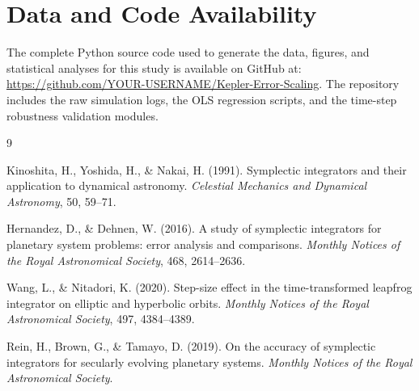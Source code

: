 \documentclass[twocolumn, 10pt]{article}
\begin{document}
\section*{Data and Code Availability}

The complete Python source code used to generate the data, figures, and statistical analyses for this study is available on GitHub at: \url{https://github.com/YOUR-USERNAME/Kepler-Error-Scaling}. The repository includes the raw simulation logs, the OLS regression scripts, and the time-step robustness validation modules.

{\small
\begin{thebibliography}{9}

Kinoshita, H., Yoshida, H., \& Nakai, H. (1991).
Symplectic integrators and their application to dynamical astronomy.
\textit{Celestial Mechanics and Dynamical Astronomy}, 50, 59--71.

Hernandez, D., \& Dehnen, W. (2016).
A study of symplectic integrators for planetary system problems: error analysis and comparisons.
\textit{Monthly Notices of the Royal Astronomical Society}, 468, 2614--2636.

Wang, L., \& Nitadori, K. (2020).
Step-size effect in the time-transformed leapfrog integrator on elliptic and hyperbolic orbits.
\textit{Monthly Notices of the Royal Astronomical Society}, 497, 4384--4389.

Rein, H., Brown, G., \& Tamayo, D. (2019).
On the accuracy of symplectic integrators for secularly evolving planetary systems.
\textit{Monthly Notices of the Royal Astronomical Society}.

\end{thebibliography}
}
\end{document}
